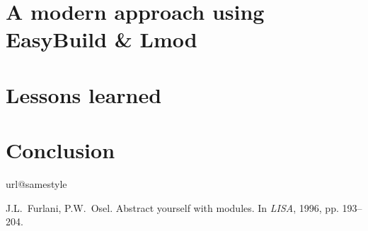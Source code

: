 \documentclass[conference, compsocconf]{IEEEtran}
\newcommand{\easybuild}{EasyBuild}
\begin{document}
\section{A modern approach using \easybuild{} \& Lmod}
\label{sec:modern}


\section{Lessons learned}
\label{sec:lessons}


\section{Conclusion}
\label{sec:conclusion}


\footnotesize
%
%

\begin{thebibliography}{10}
\providecommand{\url}[1]{#1}
\csname url@samestyle\endcsname
\providecommand{\newblock}{\relax}
\providecommand{\bibinfo}[2]{#2}
\providecommand{\BIBentrySTDinterwordspacing}{\spaceskip=0pt\relax}
\providecommand{\BIBentryALTinterwordstretchfactor}{4}
\providecommand{\BIBentryALTinterwordspacing}{\spaceskip=\fontdimen2\font plus
\BIBentryALTinterwordstretchfactor\fontdimen3\font minus
  \fontdimen4\font\relax}
\providecommand{\BIBforeignlanguage}[2]{{%
\expandafter\ifx\csname l@#1\endcsname\relax
\typeout{** WARNING: IEEEtran.bst: No hyphenation pattern has been}%
\typeout{** loaded for the language `#1'. Using the pattern for}%
\typeout{** the default language instead.}%
\else
\language=\csname l@#1\endcsname
\fi
#2}}
\providecommand{\BIBdecl}{\relax}
\BIBdecl

J.L.~Furlani, P.W.~Osel.
\newblock Abstract yourself with modules.
\newblock In \textit{LISA}, 1996, pp. 193--204.


\end{thebibliography}
\end{document}
